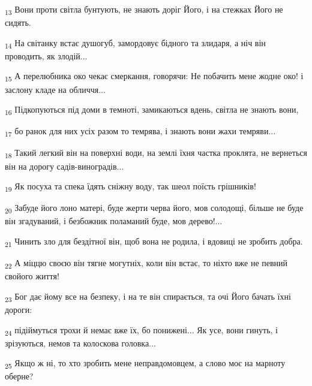 \begin{tcolorbox}
\textsubscript{13} Вони проти світла бунтують, не знають доріг Його, і на стежках Його не сидять.
\end{tcolorbox}
\begin{tcolorbox}
\textsubscript{14} На світанку встає душогуб, замордовує бідного та злидаря, а ніч він проводить, як злодій...
\end{tcolorbox}
\begin{tcolorbox}
\textsubscript{15} А перелюбника око чекає смеркання, говорячи: Не побачить мене жодне око! і заслону кладе на обличчя...
\end{tcolorbox}
\begin{tcolorbox}
\textsubscript{16} Підкопуються під доми в темноті, замикаються вдень, світла не знають вони,
\end{tcolorbox}
\begin{tcolorbox}
\textsubscript{17} бо ранок для них усіх разом то темрява, і знають вони жахи темряви...
\end{tcolorbox}
\begin{tcolorbox}
\textsubscript{18} Такий легкий він на поверхні води, на землі їхня частка проклята, не вернеться він на дорогу садів-виноградів...
\end{tcolorbox}
\begin{tcolorbox}
\textsubscript{19} Як посуха та спека їдять сніжну воду, так шеол поїсть грішників!
\end{tcolorbox}
\begin{tcolorbox}
\textsubscript{20} Забуде його лоно матері, буде жерти черва його, мов солодощі, більше не буде він згадуваний, і безбожник поламаний буде, мов дерево!...
\end{tcolorbox}
\begin{tcolorbox}
\textsubscript{21} Чинить зло для бездітної він, щоб вона не родила, і вдовиці не зробить добра.
\end{tcolorbox}
\begin{tcolorbox}
\textsubscript{22} А міццю своєю він тягне могутніх, коли він встає, то ніхто вже не певний свойого життя!
\end{tcolorbox}
\begin{tcolorbox}
\textsubscript{23} Бог дає йому все на безпеку, і на те він спирається, та очі Його бачать їхні дороги:
\end{tcolorbox}
\begin{tcolorbox}
\textsubscript{24} підіймуться трохи й немає вже їх, бо понижені... Як усе, вони гинуть, і зрізуються, немов та колоскова головка...
\end{tcolorbox}
\begin{tcolorbox}
\textsubscript{25} Якщо ж ні, то хто зробить мене неправдомовцем, а слово моє на марноту оберне?
\end{tcolorbox}
